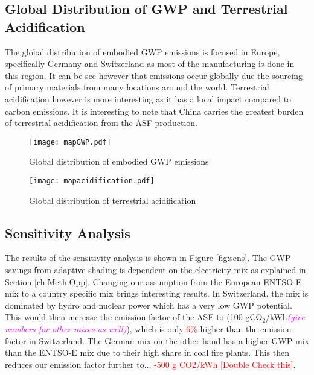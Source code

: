 \subsection{Global Distribution of GWP and Terrestrial Acidification}

The global distribution of embodied GWP emissions is focused in Europe, specifically Germany and Switzerland as most of the manufacturing is done in this region. It can be see however that emissions occur globally due the sourcing of primary materials from many locations around the world. Terrestrial acidification however is more interesting as it has a local impact compared to carbon emissions. It is interesting to note that China carries the greatest burden of terrestrial acidification from the ASF production.
 
\begin{figure}[H]
\begin{center}
\texttt{[image: mapGWP.pdf]}
\caption{Global distribution of embodied GWP emissions}
\label{fig:mapGWP}
\end{center}
\end{figure}

\begin{figure}[H]
\begin{center}
\texttt{[image: mapacidification.pdf]}
\caption{Global distribution of terrestrial acidification}
\label{fig:mapAcid}
\end{center}
\end{figure}

\subsection{Sensitivity Analysis}

The results of the sensitivity analysis is shown in Figure \ref{fig:sens}. The GWP savings from adaptive shading is dependent on the electricity mix as explained in Section \ref{ch:Meth:Opp}. Changing our assumption from the European ENTSO-E mix to a country specific mix brings interesting results. In Switzerland, the mix is dominated by hydro and nuclear power which has a very low GWP potential\cite{itten2012life}. This would then increase the emission factor of the ASF to (100 gCO${_2}$/kWh\textcolor{magenta}{\textit{(give numbers for other mixes as well)}}), which is only \textcolor{red}{6\%} higher than the emission factor in Switzerland. The German mix on the other hand has a higher GWP mix than the ENTSO-E mix due to their high share in coal fire plants. This then reduces our emission factor further to... \textcolor{red}{-500 g CO2/kWh} \textcolor{red}{[Double Check this]}.\\

